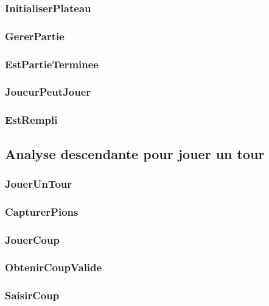     \subsubsection{InitialiserPlateau}
      
    \subsubsection{GererPartie}
      
    \subsubsection{EstPartieTerminee}
      
    \subsubsection{JoueurPeutJouer}
      
    \subsubsection{EstRempli}
      

  \subsection{Analyse descendante pour jouer un tour}
    \subsubsection{JouerUnTour}
      
    \subsubsection{CapturerPions}
      
    \subsubsection{JouerCoup}
      
    \subsubsection{ObtenirCoupValide}
      
    \subsubsection{SaisirCoup}
      
